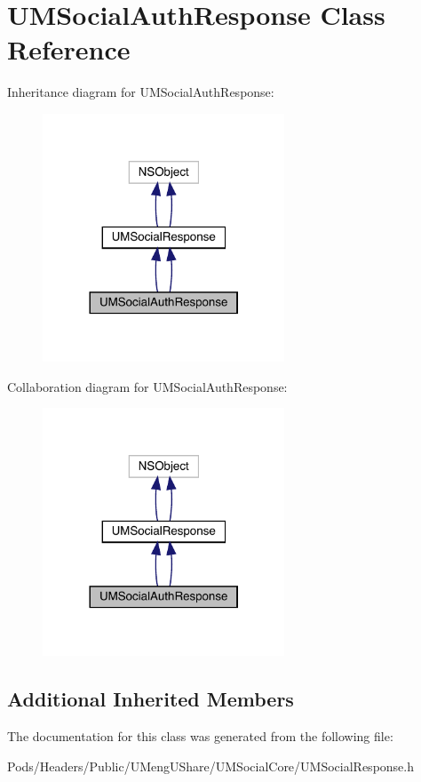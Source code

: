 \hypertarget{interface_u_m_social_auth_response}{}\section{U\+M\+Social\+Auth\+Response Class Reference}
\label{interface_u_m_social_auth_response}


Inheritance diagram for U\+M\+Social\+Auth\+Response\+:\nopagebreak
\begin{figure}[H]
\begin{center}
\leavevmode
\includegraphics[width=204pt]{interface_u_m_social_auth_response__inherit__graph}
\end{center}
\end{figure}


Collaboration diagram for U\+M\+Social\+Auth\+Response\+:\nopagebreak
\begin{figure}[H]
\begin{center}
\leavevmode
\includegraphics[width=204pt]{interface_u_m_social_auth_response__coll__graph}
\end{center}
\end{figure}
\subsection*{Additional Inherited Members}


The documentation for this class was generated from the following file\+:\begin{DoxyCompactItemize}
\item 
Pods/\+Headers/\+Public/\+U\+Meng\+U\+Share/\+U\+M\+Social\+Core/U\+M\+Social\+Response.\+h\end{DoxyCompactItemize}
